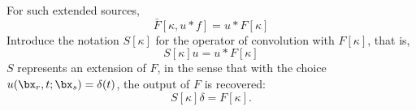 For such extended sources,
\[
  \bar{F}[\kappa,u*f] = u*F[\kappa]
\]
Introduce the notation $S[\kappa]$ for the operator of convolution
with $F[\kappa]$, that is,
\begin{equation}
  \label{eqn:sdef}
  S[\kappa]u = u*F[\kappa]
\end{equation}
$S$ represents an
extension of $F$, in the sense that with the choice
$u(\bx_r,t;\bx_s)=\delta(t)$, the output of $F$ is recovered:
\begin{equation}
  \label{eqn:sconsist}
  S[\kappa]\delta = F[\kappa].
\end{equation}



